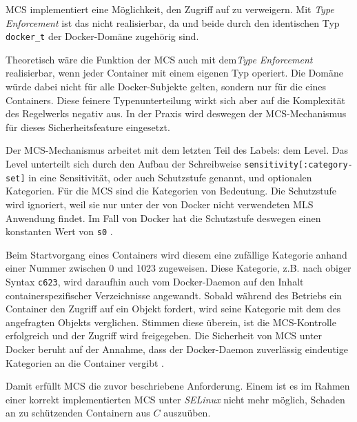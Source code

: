 \documentclass[../main.tex]{subfiles}
\begin{document}
					MCS implementiert eine Möglichkeit, \cbroken{} den Zugriff auf \cvalid{} zu verweigern. Mit \emph{Type Enforcement} ist das nicht realisierbar, da \cbroken{} und \cvalid{} beide durch den identischen Typ \texttt{docker\_t} der Docker-Domäne zugehörig sind.

					Theoretisch wäre die Funktion der MCS auch mit dem\emph{Type Enforcement} realisierbar, wenn jeder Container mit einem eigenen Typ operiert. Die Domäne würde dabei nicht für alle Docker-Subjekte gelten, sondern nur für die eines Containers. Diese feinere Typenunterteilung wirkt sich aber auf die Komplexität des Regelwerks negativ aus. In der Praxis wird deswegen der MCS-Mechanismus für dieses Sicherheitsfeature eingesetzt.


					Der MCS-Mechanismus arbeitet mit dem letzten Teil des Labels: dem Level. Das Level unterteilt sich durch den Aufbau der Schreibweise \texttt{sensitivity[:category-set]} in eine Sensitivität, oder auch Schutzstufe genannt, und optionalen Kategorien. Für die MCS sind die Kategorien von Bedeutung. Die Schutzstufe wird ignoriert, weil sie nur unter der von Docker nicht verwendeten \acrshort{MLS} Anwendung findet. Im Fall von Docker hat die Schutzstufe deswegen einen konstanten Wert von \texttt{s0} \cite{selinuxRedhatMCS}\cite{selinuxJamesMorrisMCS}.

					Beim Startvorgang eines Containers wird diesem eine zufällige Kategorie anhand einer Nummer zwischen 0 und 1023 zugeweisen. Diese Kategorie, z.B. nach obiger Syntax \texttt{c623}, wird daraufhin auch vom Docker-Daemon auf den Inhalt containerspezifischer Verzeichnisse angewandt. Sobald während des Betriebs ein Container den Zugriff auf ein Objekt fordert, wird seine Kategorie mit dem des angefragten Objekts verglichen. Stimmen diese überein, ist die MCS-Kontrolle erfolgreich und der Zugriff wird freigegeben. Die Sicherheit von MCS unter Docker beruht auf der Annahme, dass der Docker-Daemon zuverlässig eindeutige Kategorien an die Container vergibt \cite[S.200f.]{learningDocker}.



					Damit erfüllt MCS die zuvor beschriebene Anforderung. Einem \cbroken{} ist es im Rahmen einer korrekt implementierten MCS unter \emph{SELinux} nicht mehr möglich, Schaden an zu schützenden Containern aus \(C\) auszuüben.
\end{document}
